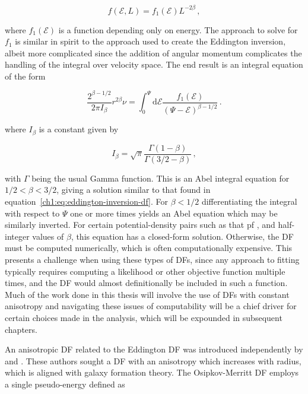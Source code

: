 \begin{equation}
    \label{ch1:eq:constant-anisotropy-df}
    f(\mathcal{E}, L) = f_{1}(\mathcal{E}) L^{-2\beta}\,,
\end{equation}

\noindent where $f_{1}(\mathcal{E})$ is a function depending only on energy. The approach to solve for $f_{1}$ is similar in spirit to the approach used to create the Eddington inversion, albeit more complicated since the addition of angular momentum complicates the handling of the integral over velocity space. The end result is an integral equation of the form

\begin{equation}
    \frac{ 2^{\beta-1/2} }{ 2\pi I_{\beta} } r^{2\beta}\nu = \int_{0}^{\Psi} \mathrm{d}\mathcal{E} \frac{ f_{1}(\mathcal{E}) }{ (\Psi-\mathcal{E})^{\beta-1/2} }\,.
\end{equation}
    
\noindent where $I_{\beta}$ is a constant given by

\begin{equation}
    I_{\beta} = \sqrt{\pi}\frac{\Gamma(1-\beta)}{\Gamma(3/2-\beta)}\,,
\end{equation}

\noindent with $\Gamma$ being the usual Gamma function. This is an Abel integral equation for $1/2 < \beta < 3/2$, giving a solution similar to that found in equation~\eqref{ch1:eq:eddington-inversion-df}. For $\beta < 1/2$ differentiating the integral with respect to $\Psi$ one or more times yields an Abel equation which may be similarly inverted. For certain potential-density pairs such as that pf \textcite{hernquist90}, and half-integer values of $\beta$, this equation has a closed-form solution. Otherwise, the DF must be computed numerically, which is often computationally expensive. This presents a challenge when using these types of DFs, since any approach to fitting typically requires computing a likelihood or other objective function multiple times, and the DF would almost definitionally be included in such a function. Much of the work done in this thesis will involve the use of DFs with constant anisotropy and navigating these issues of computability will be a chief driver for certain choices made in the analysis, which will be expounded in subsequent chapters.

An anisotropic DF related to the Eddington DF was introduced independently by \textcite{osipkov79} and \textcite{merritt85}. These authors sought a DF with an anisotropy which increases with radius, which is aligned with galaxy formation theory. The Osipkov-Merritt DF employs a single pseudo-energy defined as 


